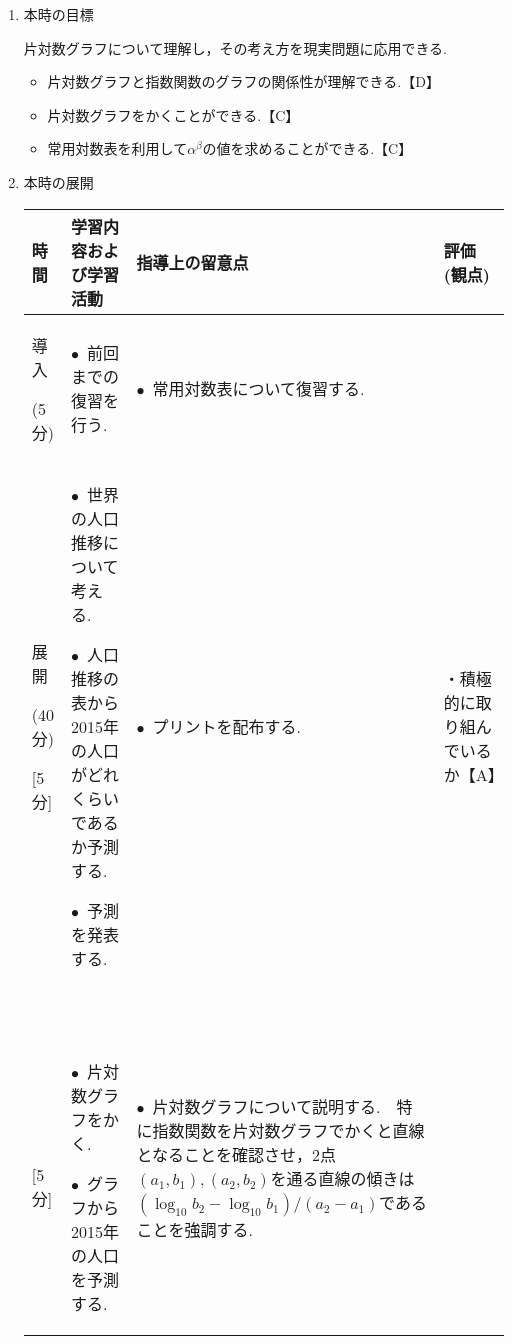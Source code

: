 \documentclass[a4paper,onecolumn,dvipdfmx]{jsarticle}
\theoremstyle{mydefinition}
\newtheorem[topline=true,rightline=true,bottomline=true,linecolor=cyan,linewidth=2pt,shadow=true,shadowcolor=cyan!70!white,shadowsize=5pt]{dfn}{定義}
\newtheorem[topline=true,rightline=true,bottomline=true,linecolor=magenta,linewidth=2pt,shadow=true,shadowcolor=magenta!70!white,shadowsize=5pt]{thm}[dfn]{定理}
\newtheorem[topline=true,rightline=true,bottomline=true]{prop}[dfn]{命題}
\newtheorem[topline=true,rightline=true,bottomline=true]{lem}[dfn]{補題}
\newtheorem[topline=true,rightline=true,bottomline=true]{cor}{系}
\newtheorem[topline=true,rightline=true,bottomline=true,linewidth=2pt]{fact}{事実}
\newtheorem[topline=true,rightline=true,bottomline=true]{Exam}{応用例題}
\newtheorem[bottomline=true]{ex}{例}
\newtheorem[rightline=true,linewidth=2pt]{prob}{問題}
\newtheorem[topline=true,rightline=true,bottomline=true]{prc}{練習}
\begin{document}
\begin{enumerate}
		\ \\
		
		\item 本時の目標
		
		片対数グラフについて理解し，その考え方を現実問題に応用できる.
		\begin{itemize}
			\item 片対数グラフと指数関数のグラフの関係性が理解できる.\hfill 【D】
			\item 片対数グラフをかくことができる.\hfill 【C】
			\item 常用対数表を利用して$\alpha^\beta$の値を求めることができる.\hfill 【C】
		\end{itemize}
		
		
		
		\newpage
		\item 本時の展開
		
		
			\begin{longtable}{|p{}|p{}|p{}|p{}|}
				\hline
				
				\hline
				時間&学習内容および学習活動&指導上の留意点&評価(観点)\\\hline
				導入
				
				(5分)&$\bullet$\ 前回までの復習を行う.&$\bullet$\ 常用対数表について復習する.&\\\hline
				
				展開
				
				(40分)
				
				[5分]&
				$\bullet$\ 世界の人口推移について考える.\vspace{1.5zw}
				
				$\bullet$\ 人口推移の表から2015年の人口がどれくらいであるか予測する.\vspace{0.5zw}
				
				$\bullet$\ 予測を発表する.
			    &
			    $\bullet$\ プリントを配布する.
			    &{\footnotesize ・積極的に取り組んでいるか【A】}
			    \\
			    &&&\\
			    &&&\\
			    ~\vspace{9.75zw}
			    
			    [5分]&~\vspace{9.75zw}
			    
			    $\bullet$\ 片対数グラフをかく.\vspace{3.25zw}
			    
			    $\bullet$\ グラフから2015年の人口を予測する.
			    
			    &$\bullet$\ 片対数グラフについて説明する.\ \ 特に指数関数を片対数グラフでかくと直線となることを確認させ，2点$(a_1,b_1),(a_2,b_2)$を通る直線の傾きは$(\log_{10}b_2-\log_{10}b_1)/(a_2-a_1)$であることを強調する.\vspace{1zw}
			    

\end{longtable}
\end{enumerate}
\end{document}

